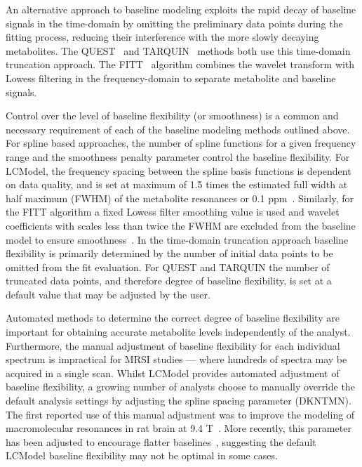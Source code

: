 \documentclass[num-refs]{wiley-article}
\begin{document}
An alternative approach to baseline modeling exploits the rapid decay of baseline signals in the time-domain by omitting the preliminary data points during the fitting process, reducing their interference with the more slowly decaying metabolites. The QUEST~\cite{Ratiney2005} and TARQUIN~\cite{Wilson2011} methods both use this time-domain truncation approach. The FITT~\cite{Young1998} algorithm combines the wavelet transform with Lowess filtering in the frequency-domain to separate metabolite and baseline signals.

Control over the level of baseline flexibility (or smoothness) is a common and necessary requirement of each of the baseline modeling methods outlined above. For spline based approaches, the number of spline functions for a given frequency range and the smoothness penalty parameter control the baseline flexibility. For LCModel, the frequency spacing between the spline basis functions is dependent on data quality, and is set at maximum of 1.5 times the estimated full width at half maximum (FWHM) of the metabolite resonances or 0.1 ppm~\cite{Provencher1993}. Similarly, for the FITT algorithm a fixed Lowess filter smoothing value is used and wavelet coefficients with scales less than twice the FWHM are excluded from the baseline model to ensure smoothness~\cite{Young1998}. In the time-domain truncation approach baseline flexibility is primarily determined by the number of initial data points to be omitted from the fit evaluation. For QUEST and TARQUIN the number of truncated data points, and therefore degree of baseline flexibility, is set at a default value that may be adjusted by the user.

Automated methods to determine the correct degree of baseline flexibility are important for obtaining accurate metabolite levels independently of the analyst. Furthermore, the manual adjustment of baseline flexibility for each individual spectrum is impractical for MRSI studies --- where hundreds of spectra may be acquired in a single scan. Whilst LCModel provides automated adjustment of baseline flexibility, a growing number of analysts choose to manually override the default analysis settings by adjusting the spline spacing parameter (DKNTMN). The first reported use of this manual adjustment was to improve the modeling of macromolecular resonances in rat brain at 9.4 T~\cite{Pfeuffer1999}. More recently, this parameter has been adjusted to encourage flatter baselines~\cite{Deelchand2016,Terpstra2010,Marjanska2018}, suggesting the default LCModel baseline flexibility may not be optimal in some cases.
\end{document}

